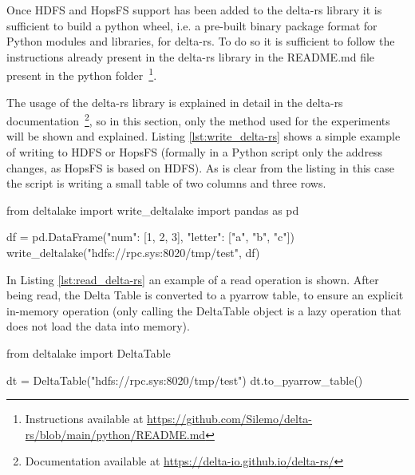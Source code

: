 Once \gls{HDFS} and \gls{HopsFS} support has been added to the delta-rs library it is sufficient to build a python wheel, i.e. a pre-built binary package format for Python modules and libraries, for delta-rs. To do so it is sufficient to follow the instructions already present in the delta-rs library in the README.md file present in the python folder~\footnote{Instructions available at \url{https://github.com/Silemo/delta-rs/blob/main/python/README.md}}.

The usage of the delta-rs library is explained in detail in the delta-rs documentation~\footnote{Documentation available at \url{https://delta-io.github.io/delta-rs/}}, so in this section, only the method used for the experiments will be shown and explained. Listing \ref{lst:write_delta-rs} shows a simple example of writing to \gls{HDFS} or \gls{HopsFS} (formally in a Python script only the address changes, as \gls{HopsFS} is based on \gls{HDFS}). As is clear from the listing in this case the script is writing a small table of two columns and three rows.

\begin{python}[caption={Writing a data frame on a Delta Table with delta-rs on \gls{HDFS} or \gls{HopsFS}}, label={lst:write_delta-rs}]
from deltalake import write_deltalake
import pandas as pd

df = pd.DataFrame({"num": [1, 2, 3], 
                   "letter": ["a", "b", "c"]})
write_deltalake("hdfs://rpc.sys:8020/tmp/test", df)
\end{python}
\medskip

In Listing \ref{lst:read_delta-rs} an example of a read operation is shown. After being read, the Delta Table is converted to a pyarrow table, to ensure an explicit in-memory operation (only calling the DeltaTable object is a lazy operation that does not load the data into memory).

\begin{python}[caption={Reading a data frame on a Delta Table with delta-rs on \gls{HDFS} or \gls{HopsFS}}, label={lst:read_delta-rs}]
from deltalake import DeltaTable

dt = DeltaTable("hdfs://rpc.sys:8020/tmp/test")
dt.to_pyarrow_table()
\end{python}
